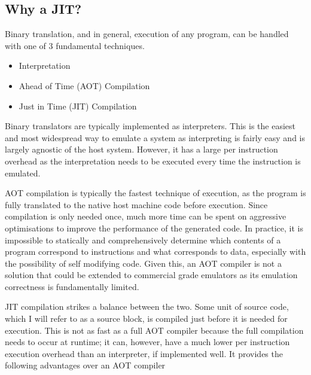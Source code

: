 \subsection{Why a JIT?}

Binary translation, and in general, execution of any program, can be handled with one of 3 fundamental techniques.

\begin{itemize}
    \item Interpretation
    \item Ahead of Time (AOT) Compilation
    \item Just in Time (JIT) Compilation
\end{itemize}

Binary translators are typically implemented as interpreters. This is the easiest and most widespread  way to emulate a system as interpreting is fairly easy and is largely agnostic of the host system. However, it has a large per instruction overhead as the interpretation needs to be executed every time the instruction is emulated.

AOT compilation is typically the fastest technique of execution, as the program is fully translated to the native host machine code before execution. Since compilation is only needed once, much more time can be spent on aggressive optimisations to improve the performance of the generated code. In practice, it is impossible to statically and comprehensively determine which contents of a program correspond to instructions and what corresponds to data, especially with the possibility of self modifying code. Given this, an AOT compiler is not a solution that could be extended to commercial grade emulators as its emulation correctness is fundamentally limited. 

JIT compilation strikes a balance between the two. Some unit of source code, which I will refer to as a source block, is compiled just before it is needed for execution. This is not as fast as a full AOT compiler because the full compilation needs to occur at runtime; it can, however, have a much lower per instruction execution overhead than an interpreter, if implemented well. It provides the following advantages over an AOT compiler

